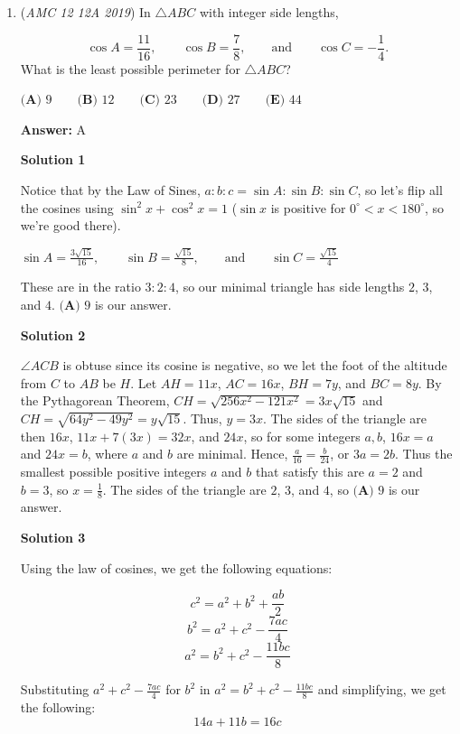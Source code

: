 \begin{enumerate}
 


	\item (\textit{AMC 12 12A 2019}) In $\triangle ABC$ with integer side lengths,

 \[\cos A=\frac{11}{16}, \qquad \cos B= \frac{7}{8}, \qquad \text{and} \qquad\cos C=-\frac{1}{4}.\]
What is the least possible perimeter for $\triangle ABC$?


 $\textbf{(A) } 9 \qquad \textbf{(B) } 12 \qquad \textbf{(C) } 23 \qquad \textbf{(D) } 27 \qquad \textbf{(E) } 44$

 \textbf{Answer: }A



\textbf{Solution 1}

Notice that by the Law of Sines, $a:b:c = \sin{A}:\sin{B}:\sin{C}$, so let's flip all the cosines using $\sin^{2}{x} + \cos^{2}{x} = 1$ ($\sin{x}$ is positive for $0^{\circ} < x < 180^{\circ}$, so we're good there).

 $\sin A=\frac{3\sqrt{15}}{16}, \qquad \sin B= \frac{\sqrt{15}}{8}, \qquad \text{and} \qquad\sin C=\frac{\sqrt{15}}{4}$

 These are in the ratio $3:2:4$, so our minimal triangle has side lengths $2$, $3$, and $4$. $\boxed{\textbf{(A) } 9}$ is our answer.

 



\textbf{Solution 2}

$\angle ACB$ is obtuse since its cosine is negative, so we let the foot of the altitude from $C$ to $AB$ be $H$. Let $AH=11x$, $AC=16x$, $BH=7y$, and $BC=8y$. By the Pythagorean Theorem, $CH=\sqrt{256x^2-121x^2}=3x\sqrt{15}$ and $CH=\sqrt{64y^2-49y^2}=y\sqrt{15}$. Thus, $y=3x$. The sides of the triangle are then $16x$, $11x+7(3x)=32x$, and $24x$, so for some integers $a,b$, $16x=a$ and $24x=b$, where $a$ and $b$ are minimal. Hence, $\frac{a}{16}=\frac{b}{24}$, or $3a=2b$. Thus the smallest possible positive integers $a$ and $b$ that satisfy this are $a=2$ and $b=3$, so $x=\frac{1}{8}$. The sides of the triangle are $2$, $3$, and $4$, so $\boxed{\textbf{(A) } 9}$ is our answer.

 



\textbf{Solution 3}

Using the law of cosines, we get the following equations:

 
 \[c^2=a^2+b^2+\frac{ab}{2}\]
 \[b^2=a^2+c^2-\frac{7ac}{4}\]
 \[a^2=b^2+c^2-\frac{11bc}{8}\]

 Substituting $a^2+c^2-\frac{7ac}{4}$ for $b^2$ in $a^2=b^2+c^2-\frac{11bc}{8}$ and simplifying, we get the following: 
 \[14a+11b=16c\]


\end{enumerate}
